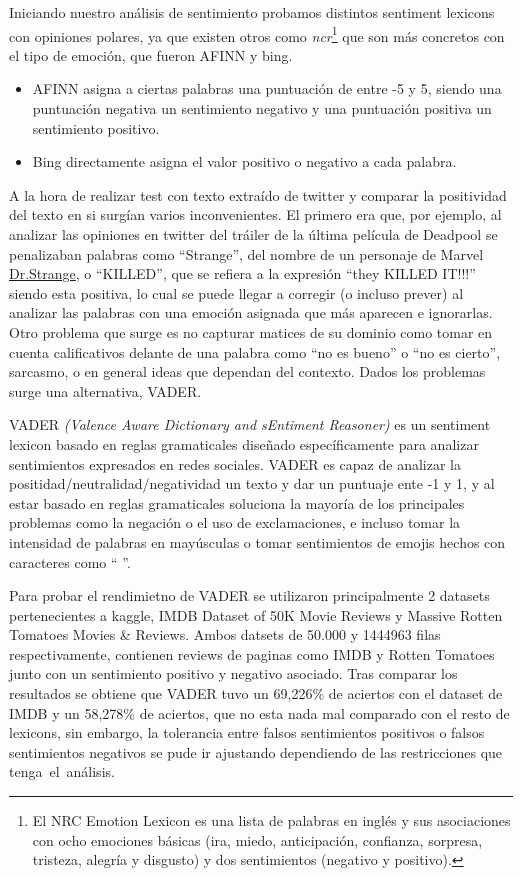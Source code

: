 \documentclass[
  letterpaper,
  DIV=11,
  numbers=noendperiod]{scrartcl}
\begin{document}
Iniciando nuestro análisis de sentimiento probamos distintos sentiment
lexicons con opiniones polares, ya que existen otros como
\emph{ncr}\footnote{El NRC Emotion Lexicon es una lista de palabras en inglés y sus asociaciones con ocho emociones básicas (ira, miedo, anticipación, confianza, sorpresa, tristeza, alegría y disgusto) y dos sentimientos (negativo y positivo).}
que son más concretos con el tipo de emoción, que fueron AFINN y bing.

\begin{itemize}
\item
  AFINN asigna a ciertas palabras una puntuación de entre -5 y 5, siendo
  una puntuación negativa un sentimiento negativo y una puntuación
  positiva un sentimiento positivo.
\item
  Bing directamente asigna el valor positivo o negativo a cada palabra.
\end{itemize}

A la hora de realizar test con texto extraído de twitter y comparar la
positividad del texto en si surgían varios inconvenientes. El primero
era que, por ejemplo, al analizar las opiniones en twitter del tráiler
de la última película de Deadpool se penalizaban palabras como
``Strange'', del nombre de un personaje de Marvel
\underline{Dr.Strange}, o ``KILLED'', que se refiera a la expresión
``they KILLED IT!!!'' siendo esta positiva, lo cual se puede llegar a
corregir (o incluso prever) al analizar las palabras con una emoción
asignada que más aparecen e ignorarlas. Otro problema que surge es no
capturar matices de su dominio como tomar en cuenta calificativos
delante de una palabra como ``no es bueno'' o ``no es cierto'',
sarcasmo, o en general ideas que dependan del contexto. Dados los
problemas surge una alternativa, VADER.

VADER \emph{(Valence Aware Dictionary and sEntiment Reasoner)} es un
sentiment lexicon basado en reglas gramaticales diseñado específicamente
para analizar sentimientos expresados en redes sociales. VADER es capaz
de analizar la positidad/neutralidad/negatividad un texto y dar un
puntuaje ente -1 y 1, y al estar basado en reglas gramaticales soluciona
la mayoría de los principales problemas como la negación o el uso de
exclamaciones, e incluso tomar la intensidad de palabras en mayúsculas o
tomar sentimientos de emojis hechos con caracteres como `` \text{:(} ''.

Para probar el rendimietno de VADER se utilizaron principalmente 2
datasets pertenecientes a kaggle, IMDB Dataset of 50K Movie Reviews y
Massive Rotten Tomatoes Movies \& Reviews. Ambos datsets de 50.000 y
1444963 filas respectivamente, contienen reviews de paginas como IMDB y
Rotten Tomatoes junto con un sentimiento positivo y negativo asociado.
Tras comparar los resultados se obtiene que VADER tuvo un 69,226\% de
aciertos con el dataset de IMDB y un 58,278\% de aciertos, que no esta
nada mal comparado con el resto de lexicons, sin embargo, la tolerancia
entre falsos sentimientos positivos o falsos sentimientos negativos se
pude ir ajustando dependiendo de las restricciones que
tenga~el~análisis.
\end{document}
